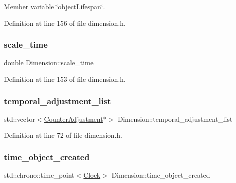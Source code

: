 Member variable \char`\"{}object\+Lifespan\char`\"{}. 



Definition at line 156 of file dimension.\+h.

\mbox{\label{class_dimension_ad3ba9c1c332756658b1e711c447831a3}} 
\subsubsection{\texorpdfstring{scale\+\_\+time}{scale\_time}}
{\footnotesize\ttfamily double Dimension\+::scale\+\_\+time\hspace{0.3cm}{\ttfamily [protected]}}



Definition at line 153 of file dimension.\+h.

\mbox{\label{class_dimension_a370bb42cca1211c7a6c66846ecec4dd9}} 
\subsubsection{\texorpdfstring{temporal\+\_\+adjustment\+\_\+list}{temporal\_adjustment\_list}}
{\footnotesize\ttfamily std\+::vector$<$\mbox{\hyperlink{struct_dimension_1_1_counter_adjustment}{Counter\+Adjustment}}$\ast$$>$ Dimension\+::temporal\+\_\+adjustment\+\_\+list}



Definition at line 72 of file dimension.\+h.

\mbox{\label{class_dimension_a99ba1a7fe44c7e52520144ab4793cad3}} 
\subsubsection{\texorpdfstring{time\+\_\+object\+\_\+created}{time\_object\_created}}
{\footnotesize\ttfamily std\+::chrono\+::time\+\_\+point$<$\mbox{\hyperlink{universe_8h_a0ef8d951d1ca5ab3cfaf7ab4c7a6fd80}{Clock}}$>$ Dimension\+::time\+\_\+object\+\_\+created\hspace{0.3cm}{\ttfamily [protected]}}



